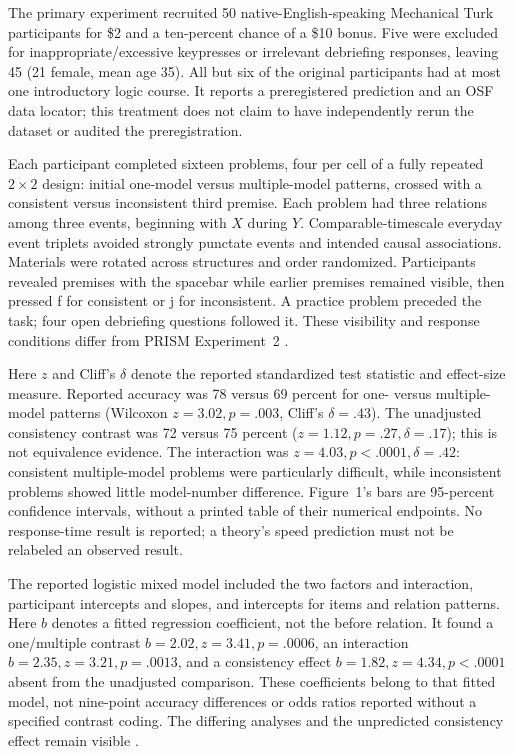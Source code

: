 The primary experiment recruited 50 native-English-speaking Mechanical Turk
participants for \$2 and a ten-percent chance of a \$10 bonus. Five were
excluded for inappropriate/excessive keypresses or irrelevant debriefing
responses, leaving 45 (21 female, mean age 35). All but six of the original
participants had at most one introductory logic course. It reports a
preregistered prediction and an OSF data locator; this treatment does not
claim to have independently rerun the dataset or audited the preregistration.

Each participant completed sixteen problems, four per cell of a fully
repeated \(2\times2\) design: initial one-model versus multiple-model
patterns, crossed with a consistent versus inconsistent third premise.
Each problem had three relations among three events, beginning with
\(X\) during \(Y\). Comparable-timescale everyday event triplets
avoided strongly punctate events and intended causal associations. Materials
were rotated across structures and order randomized. Participants revealed
premises with the spacebar while earlier premises remained visible, then
pressed f for consistent or j for inconsistent. A practice problem preceded
the task; four open debriefing questions followed it. These visibility and
response conditions differ from PRISM Experiment~2
\cite[pp.~3--4; Appendix]{KellyKhemlani2019Durative}.

Here \(z\) and Cliff's \(\delta\) denote the reported standardized
test statistic and effect-size measure. Reported accuracy was 78 versus
69 percent for one- versus multiple-model
patterns (Wilcoxon \(z=3.02,p=.003\), Cliff's \(\delta=.43\)).
The unadjusted consistency contrast was 72 versus 75 percent
(\(z=1.12,p=.27,\delta=.17\)); this is not equivalence evidence.
The interaction was \(z=4.03,p<.0001,\delta=.42\): consistent
multiple-model problems were particularly difficult, while inconsistent
problems showed little model-number difference. Figure~1's bars are
95-percent confidence intervals, without a printed table of their numerical
endpoints. No response-time result is reported; a theory's speed prediction
must not be relabeled an observed result.

The reported logistic mixed model included the two factors and interaction,
participant intercepts and slopes, and intercepts for items and relation
patterns. Here \(b\) denotes a fitted regression coefficient, not the
before relation. It found a one/multiple contrast
\(b=2.02,z=3.41,p=.0006\), an interaction
\(b=2.35,z=3.21,p=.0013\), and a consistency effect
\(b=1.82,z=4.34,p<.0001\) absent from the unadjusted comparison.
These coefficients belong to that fitted model, not nine-point accuracy
differences or odds ratios reported without a specified contrast coding.
The differing analyses and the unpredicted consistency effect remain visible
\cite[pp.~4--5, fig.~1]{KellyKhemlani2019Durative}.

